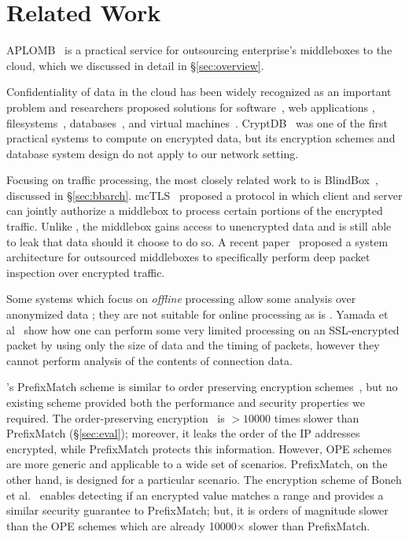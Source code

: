 
\section{Related Work}
\label{sec:related}

APLOMB~\cite{aplomb} is a practical service for outsourcing enterprise's middleboxes to the cloud, which we discussed in detail in \S\ref{sec:overview}.

Confidentiality of data in the cloud has been widely recognized as an important problem and researchers proposed solutions for software~\cite{Baumann:Haven}, web applications \cite{giffin:hails, Mylar},  filesystems~\cite{blaze:cfs, kallahalla:plutus, goh:sirius},  databases~\cite{popa:cryptdb, blindseer},  and virtual machines~\cite{Zhang:CloudVisor}. 
CryptDB~\cite{popa:cryptdb} was one of the first practical systems to compute on encrypted data, but its encryption schemes and database system design do not apply to our network setting. 

Focusing on traffic processing, the most closely related work to \sys is BlindBox~\cite{blindbox}, discussed in \S\ref{sec:bbarch}.  mcTLS~\cite{mctls} proposed a protocol in which client and server can jointly authorize a middlebox to process certain portions of the encrypted traffic. Unlike \sys, the middlebox  gains access to unencrypted data and is still able to leak that data should it choose to do so. A recent paper~\cite{secmb} proposed a system architecture for outsourced middleboxes to specifically perform deep packet inspection over encrypted traffic.

Some systems which focus on {\it offline} processing allow some analysis over anonymized data \cite{Vern:Anonymize06, Vern:Anonymize03}; they are not suitable for online processing as is \sys.
Yamada et al~\cite{Yamada_IDS} show how one can perform some very limited processing on an SSL-encrypted packet by using only the size of data and the timing of packets, however they cannot perform analysis of the contents of connection data.

\sys's PrefixMatch scheme is similar to order preserving encryption schemes~\cite{agrawal:ope}, but no existing scheme provided both the performance and security properties we required.
The order-preserving encryption~\cite{boldyreva:ope, popa:mope}  is 
 $>10000$ times slower than PrefixMatch (\S\ref{sec:eval}); moreover, it leaks the order of the IP addresses encrypted, while PrefixMatch protects this information. However, OPE schemes are more generic and applicable to a wide set of scenarios. PrefixMatch, on the other hand, is designed for a particular scenario.
The encryption scheme of Boneh et al.~\cite{BonehRange} enables detecting if an encrypted value matches a range and provides a similar security guarantee to PrefixMatch; but, it is orders of magnitude slower than the OPE schemes which are already 10000$\times$ slower than PrefixMatch. 


